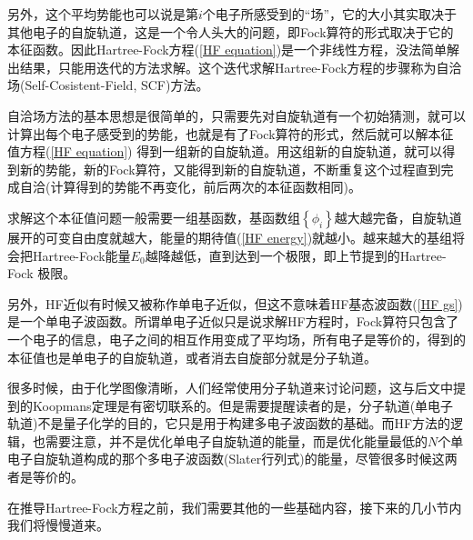 \documentclass[12pt,a4paper,openany,twoside]{book}
\numberwithin{equation}{section}
\begin{document}
          另外，这个平均势能也可以说是第$i$个电子所感受到的“场”，它的大小其实取决于其他电子的自旋轨道，这是一个令人头大的问题，即Fock算符的形式取决于它的本征函数。因此Hartree-Fock方程(\ref{HF equation})是一个非线性方程，没法简单解出结果，只能用迭代的方法求解。这个迭代求解Hartree-Fock方程的步骤称为自洽场(Self-Cosistent-Field, SCF)方法。

          自洽场方法的基本思想是很简单的，只需要先对自旋轨道有一个初始猜测，就可以计算出每个电子感受到的势能，也就是有了Fock算符的形式，然后就可以解本征值方程(\ref{HF equation}) 得到一组新的自旋轨道。用这组新的自旋轨道，就可以得到新的势能，新的Fock算符，又能得到新的自旋轨道，不断重复这个过程直到完成自洽(计算得到的势能不再变化，前后两次的本征函数相同)。
          
          求解这个本征值问题一般需要一组基函数，基函数组$\left\{\phi_i\right\}$越大越完备，自旋轨道展开的可变自由度就越大，能量的期待值(\ref{HF energy})就越小。越来越大的基组将会把Hartree-Fock能量$E_0$越降越低，直到达到一个极限，即上节提到的Hartree-Fock 极限。

          另外，HF近似有时候又被称作单电子近似，但这不意味着HF基态波函数(\ref{HF gs})是一个单电子波函数。所谓单电子近似只是说求解HF方程时，Fock算符只包含了一个电子的信息，电子之间的相互作用变成了平均场，所有电子是等价的，得到的本征值也是单电子的自旋轨道，或者消去自旋部分就是分子轨道。
          
          很多时候，由于化学图像清晰，人们经常使用分子轨道来讨论问题，这与后文中提到的Koopmans定理是有密切联系的。但是需要提醒读者的是，分子轨道(单电子轨道)不是量子化学的目的，它只是用于构建多电子波函数的基础。而HF方法的逻辑，也需要注意，并不是优化单电子自旋轨道的能量，而是优化能量最低的$N$个单电子自旋轨道构成的那个多电子波函数(Slater行列式)的能量，尽管很多时候这两者是等价的。

          在推导Hartree-Fock方程之前，我们需要其他的一些基础内容，接下来的几小节内我们将慢慢道来。
          
\end{document}
